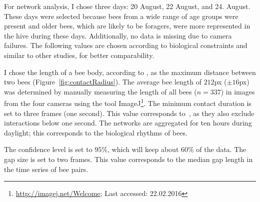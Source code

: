 For network analysis, I chose three days: 20 August, 22 August, and 24. August.
These days were selected because bees from a wide range of age groups were present and older bees, which are likely to be foragers, were more represented in the hive during these days.
Additionally, no data is missing due to camera failures.
The following values are chosen according to biological constraints and similar to other studies, for better comparability.

I chose the length of a bee body, according to \textcite{baracchi2014socio}, as the maximum distance between two bees (Figure~\ref{fig:contactRadius}).
The average bee length of $212$px ($\pm 16$px)  was determined by manually measuring the length of all bees ($n=337$) in images from the four cameras using the tool ImageJ\footnote{\url{http://imagej.net/Welcome}; Last accessed:
 22.02.2016}.
The minimum contact duration is set to three frames (one second). This value corresponds to~\textcite{mersch2013tracking}, as they also exclude interactions below one second.
The networks are aggregated for ten hours during daylight; this corresponds to the biological rhythms of bees.

The confidence level is set to $95\%$, which will keep about 60\% of the data.
The gap size is set to two frames. This value corresponds to the median gap length in the time series of bee pairs.

